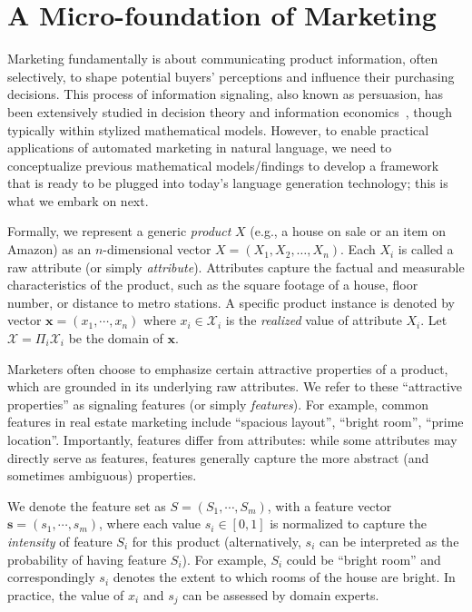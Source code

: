 

\section{A Micro-foundation of Marketing}
Marketing fundamentally is about communicating product information, often selectively, to shape potential buyers' perceptions and influence their purchasing decisions. This process of information signaling, also known as persuasion, has been extensively studied in decision theory and information economics~\citep{spence1978job,arrow1996economics,kamenica2011bayesian,connelly2011signaling}, though typically within stylized mathematical models. However, to enable practical applications of automated marketing in natural language, we need to conceptualize previous mathematical models/findings to develop a framework that is ready to be plugged into today's language generation technology; this is what we embark on next.   

Formally, we represent a generic \emph{product}  $X$ (e.g., a house on sale or an item on Amazon) as an $n$-dimensional vector $X = (X_1, X_2, \dots, X_n)$. Each $X_i$ is called a raw attribute (or simply \emph{attribute}). Attributes capture the factual and measurable characteristics of the product, such as the square footage of a house, floor number, or distance to metro stations. A specific product instance is denoted by vector $\mathbf{x} = (x_1, \cdots, x_n)$ where $x_i \in \mathcal{X}_i$ is the \emph{realized} value of attribute $X_i$. Let $\mathcal{X} = \Pi_{i} \mathcal{X}_i$ be the domain of $\mathbf{x}$.  

Marketers often choose to emphasize certain attractive properties of a product, which are grounded in its underlying raw attributes. We refer to these ``attractive properties'' as signaling features (or simply \emph{features}).  For example, common features in real estate marketing include ``spacious layout'', ``bright room'', ``prime location''. Importantly, features differ from attributes: while some attributes may directly serve as features, features generally capture the more abstract (and sometimes ambiguous) properties.

We denote the feature set as $S = (S_1, \cdots, S_m)$, with a feature vector $\mathbf{s} = (s_1, \cdots, s_m)$, where each value $s_i\in [0,1]$ is normalized to capture the \emph{intensity} of  feature $S_i$ for this product (alternatively, $s_i$ can be interpreted as the probability of having feature $S_i$). For example, $S_i$ could be ``bright room'' and correspondingly $s_i$ denotes the extent to which rooms of the house are bright. In practice, the value of $x_i$ and $s_j$ can be assessed by domain experts. 

